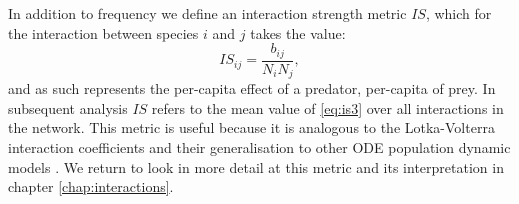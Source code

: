 In addition to frequency we define an interaction strength metric $IS$, which for the interaction between species $i$ and $j$ takes the value:
\begin{equation}
IS_{ij} = \frac{b_{ij}}{N_iN_j},
\label{eq:is3}
\end{equation}
%
and as such represents the per-capita effect of a predator, per-capita of prey. In subsequent analysis $IS$ refers to the mean value of \eqref{eq:is3} over all interactions in the network. This metric is useful because it is analogous to the Lotka-Volterra interaction coefficients and their generalisation to other ODE population dynamic models \cite{berlow2004interaction}. We return to look in more detail at this metric and its interpretation in chapter \ref{chap:interactions}.
